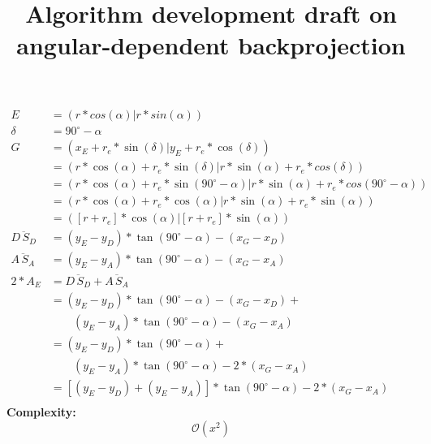 \documentclass[a4paper,10pt,fleqn]{scrartcl}
\date{}
\title{Algorithm development draft on angular-dependent backprojection}
\begin{document}
\maketitle
\begin{align*}
E &= (r * cos(\alpha) | r * sin(\alpha)) \\
\delta &= 90^\circ - \alpha \\
G &= (x_E + r_e * \sin(\delta) | y_E + r_e * \cos(\delta)) \\
  &= (r * \cos(\alpha) + r_e * \sin(\delta) | r * \sin(\alpha) + r_e * cos(\delta))\\
  &= (r * \cos(\alpha) + r_e * \sin(90^\circ - \alpha) | r * \sin(\alpha) + r_e * cos(90^\circ - \alpha))\\
  &= (r * \cos(\alpha) + r_e * \cos(\alpha) | r * \sin(\alpha) + r_e * \sin(\alpha))\\
  &= ([r + r_e] * \cos(\alpha) | [r + r_e] * \sin(\alpha))\\
\overline{D\,S_D} &= (y_E - y_D) * \tan(90^\circ-\alpha) - (x_G - x_D) \\
\overline{A\,S_A} &= (y_E - y_A) * \tan(90^\circ-\alpha) - (x_G - x_A) \\
2 * A_E &= \overline{D\,S_D} + \overline{A\,S_A} \\ %
  &= (y_E - y_D) * \tan(90^\circ-\alpha) - (x_G - x_D) +\\&\qquad(y_E - y_A) * \tan(90^\circ-\alpha) - (x_G - x_A)\\
  &= (y_E - y_D) * \tan(90^\circ-\alpha) +\\&\qquad(y_E - y_A) * \tan(90^\circ-\alpha) - 2 * (x_G - x_A) \\
  &= [(y_E - y_D) + (y_E - y_A)] * \tan(90^\circ-\alpha) - 2 * (x_G - x_A)\\
\end{align*}
\textbf{Complexity:}
\begin{equation}
\mathcal{O}(x^2)
\end{equation}
\end{document}
